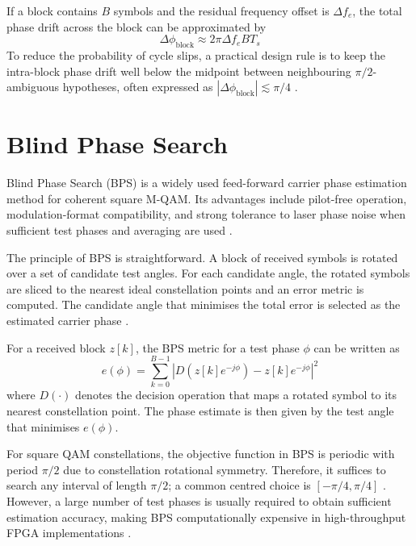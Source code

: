 If a block contains $B$ symbols and the residual frequency offset is $\Delta f_e$, the total
phase drift across the block can be approximated by
\begin{equation}
\Delta \phi_{\mathrm{block}} \approx 2 \pi \Delta f_e B T_s
\end{equation}
To reduce the probability of cycle slips, a practical design rule is to keep the intra-block
phase drift well below the midpoint between neighbouring $\pi/2$-ambiguous hypotheses, often
expressed as $|\Delta \phi_{\mathrm{block}}| \lesssim \pi/4$ \cite{Pfau2009JLT}.

\section{Blind Phase Search}
Blind Phase Search (BPS) is a widely used feed-forward carrier phase estimation method for
coherent square M-QAM. Its advantages include pilot-free operation, modulation-format
compatibility, and strong tolerance to laser phase noise when sufficient test phases and
averaging are used \cite{Pfau2009JLT,Yang2018OE}.

The principle of BPS is straightforward. A block of received symbols is rotated over a set
of candidate test angles. For each candidate angle, the rotated symbols are sliced to the
nearest ideal constellation points and an error metric is computed. The candidate angle
that minimises the total error is selected as the estimated carrier phase \cite{Pfau2009JLT}.


For a received block $z[k]$, the BPS metric for a test phase $\phi$ can be written as
\begin{equation}
e(\phi) = \sum_{k=0}^{B-1} \left| D\left(z[k] e^{-j\phi}\right) - z[k] e^{-j\phi} \right|^2
\end{equation}
where $D(\cdot)$ denotes the decision operation that maps a rotated symbol to its nearest
constellation point. The phase estimate is then given by the test angle that minimises
$e(\phi)$.

For square QAM constellations, the objective function in BPS is periodic with period $\pi/2$
due to constellation rotational symmetry. Therefore, it suffices to search any interval of
length $\pi/2$; a common centred choice is $[-\pi/4,\pi/4]$ \cite{Pfau2009JLT}. However, a
large number of test phases is usually required to obtain sufficient estimation accuracy,
making BPS computationally expensive in high-throughput FPGA implementations
\cite{Pfau2009JLT,Yang2018OE}.

